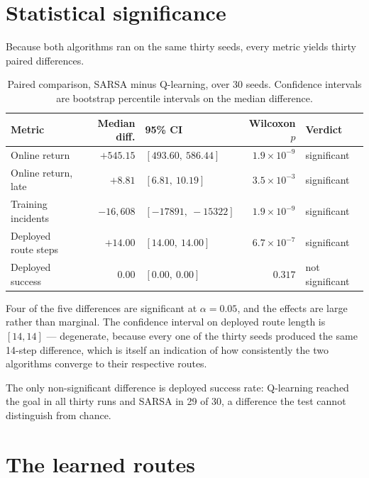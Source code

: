 \section{Statistical significance}

Because both algorithms ran on the same thirty seeds, every metric yields thirty paired
differences.

\begin{table}[ht]
\centering
\caption[Paired significance tests]{Paired comparison, SARSA minus Q-learning, over 30 seeds.
Confidence intervals are bootstrap percentile intervals on the median difference.}
\label{tab:significance}
\begin{tabular}{lrlrl}
\toprule
\textbf{Metric} & \textbf{Median diff.} & \textbf{95\% CI} & \textbf{Wilcoxon $p$} & \textbf{Verdict} \\
\midrule
Online return            & $+545.15$   & $[493.60,\ 586.44]$        & $1.9\times10^{-9}$ & significant \\
Online return, late      & $+8.81$     & $[6.81,\ 10.19]$           & $3.5\times10^{-3}$ & significant \\
Training incidents       & $-16{,}608$ & $[-17891,\ -15322]$        & $1.9\times10^{-9}$ & significant \\
Deployed route steps     & $+14.00$    & $[14.00,\ 14.00]$          & $6.7\times10^{-7}$ & significant \\
Deployed success         & $0.00$      & $[0.00,\ 0.00]$            & $0.317$            & not significant \\
\bottomrule
\end{tabular}
\end{table}

Four of the five differences are significant at $\alpha = 0.05$, and the effects are large rather
than marginal. The confidence interval on deployed route length is $[14, 14]$ --- degenerate,
because every one of the thirty seeds produced the same 14-step difference, which is itself an
indication of how consistently the two algorithms converge to their respective routes.

The only non-significant difference is deployed success rate: Q-learning reached the goal in all
thirty runs and SARSA in 29 of 30, a difference the test cannot distinguish from chance.

\section{The learned routes}

